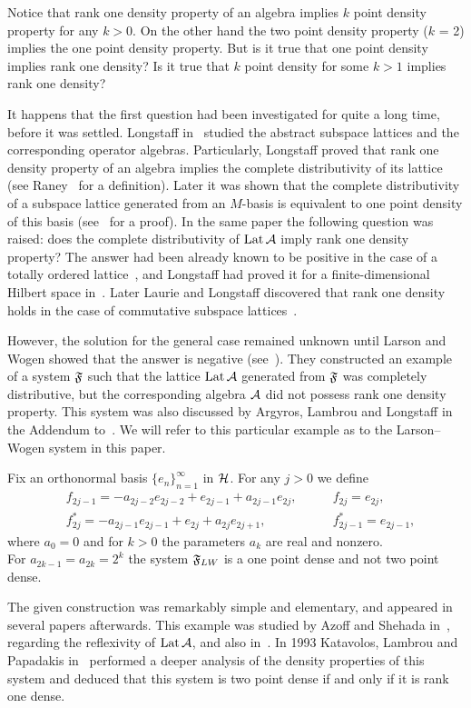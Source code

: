 \documentclass[12pt,oneside,a4paper]{amsart}
\begin{document}
  Notice that rank one density property of an algebra implies $k$ point density property for any $k > 0$.
  On the other hand the two point density property ($k$ = 2) implies the one point density property.
  But is it true that one point density implies rank one density?
  Is it true that $k$ point density for some $k > 1$ implies rank one density?

  It happens that the first question had been investigated for quite a long time, before it was settled.
  Long\-staff in~\cite{longstaff} studied the abstract subspace lattices and the corresponding operator algebras.
  Particularly, Longstaff proved that rank one density property of an algebra implies
    the complete distributivity of its lattice (see Raney~\cite{raney} for a definition).
  Later it was shown that the complete distributivity of a subspace lattice generated from an $M$-basis
    is equivalent to one point density of this basis (see~\cite{argyroslambrou} for a proof).
  In the same paper the following question was raised: does the complete distributivity of $\lattice$ imply rank one density property?
  The answer had been already known to be positive in the case of a totally ordered lattice~\cite{erdos}, and
    Longstaff had proved it for a finite-dimensional Hilbert space in~\cite{longstaff}.
  Later Laurie and Longstaff discovered that rank one density holds in the case of commutative subspace lattices~\cite{laurielongstaff}.

  However, the solution for the general case remained unknown until Larson and Wogen showed that the answer is negative (see~\cite{larson}).
  They constructed an example of a system $\fsys$ such that the lattice $\lattice$ generated from $\fsys$
    was completely distributive, but the corresponding algebra $\cal{A}$
    did not possess rank one density property.
  This system was also discussed by Argyros, Lambrou and Longstaff in the Addendum to~\cite{argyroslambrou}.
  We will refer to this particular example as to the Larson--Wogen system in this paper.
  \begin{example}
    \label{lw-sys}
    Fix an orthonormal basis $\{e_n\}_{n=1}^\infty$ in $\cal{H}$. For any $j > 0$ we define
    \begin{align*}
      &f_{2j-1}=-a_{2j-2}e_{2j-2} + e_{2j-1} + a_{2j-1}e_{2j}, \qquad &f_{2j}=e_{2j},\\
      &f^*_{2j}=-a_{2j-1}e_{2j-1}+e_{2j}+a_{2j}e_{2j+1}, \qquad &f^*_{2j-1}=e_{2j-1},
    \end{align*}
    where $a_0 = 0$ and for $k > 0$ the parameters $a_k$ are real and nonzero.\\
    For $a_{2k-1}= a_{2k} = 2^k$ the system $\fsys_{LW}$ is a one point dense and not two point dense.
  \end{example}
  The given construction was remarkably simple and elementary, and appeared in several papers afterwards.
  This example was studied by Azoff and Shehada in~\cite{azoff}, regarding the reflexivity of $\lattice$, and also in~\cite{me}.
  In 1993 Katavolos, Lambrou and Papadakis in~\cite{katavolos} performed a deeper analysis of the density properties
    of this system and deduced that this system is two point dense if and only if it is rank one dense.
\end{document}
